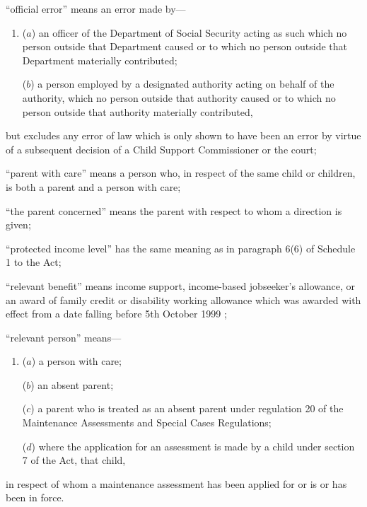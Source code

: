 \documentclass[a4paper,12pt]{article}
\begin{document}
\begin{enumerate}
“official error” means an error made by—
\begin{enumerate}\item[]
    ($a$) 
    an officer of the Department of Social Security acting as such which no person outside that Department caused or to which no person outside that Department materially contributed;



($b$) a person employed by a designated authority acting on behalf of the authority, which no person outside that authority caused or to which no person outside that authority materially contributed,
\end{enumerate}
but excludes any error of law which is only shown to have been an error by virtue of a subsequent decision of a Child Support Commissioner or the court;

“parent with care” means a person who, in respect of the same child or children, is both a parent and a person with care;

“the parent concerned” means the parent with respect to whom a direction is given;

“protected income level” has the same meaning as in paragraph 6(6) of Schedule 1 to the Act;

“relevant benefit” means income support, 
income-based jobseeker’s allowance,  %
or an award of family credit or disability working allowance which was awarded with effect from a date falling before 5th October 1999%
;

“relevant person” means—
\begin{enumerate}\item[]
($a$) a person with care;

($b$) an absent parent;

($c$) a parent who is treated as an absent parent under regulation 20 of the Maintenance Assessments and Special Cases Regulations;

($d$) where the application for an assessment is made by a child under section 7 of the Act, that child,
\end{enumerate}
in respect of whom a maintenance assessment has been applied for or is or has been in force.
\end{enumerate}
\end{document}
